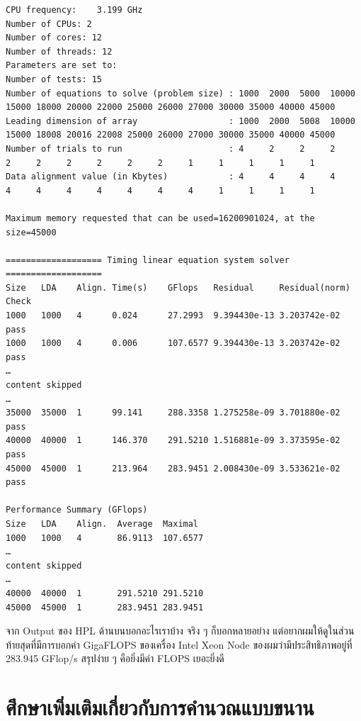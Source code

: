 \begin{lstlisting}[basicstyle=\ttfamily\footnotesize\linespread{0.5}]
CPU frequency:    3.199 GHz
Number of CPUs: 2
Number of cores: 12
Number of threads: 12
Parameters are set to:
Number of tests: 15
Number of equations to solve (problem size) : 1000  2000  5000  10000 15000 18000 20000 22000 25000 26000 27000 30000 35000 40000 45000
Leading dimension of array                  : 1000  2000  5008  10000 15000 18008 20016 22008 25000 26000 27000 30000 35000 40000 45000
Number of trials to run                     : 4     2     2     2     2     2     2     2     2     2     1     1     1     1     1
Data alignment value (in Kbytes)            : 4     4     4     4     4     4     4     4     4     4     4     1     1     1     1

Maximum memory requested that can be used=16200901024, at the size=45000

=================== Timing linear equation system solver ===================
Size   LDA    Align. Time(s)    GFlops   Residual     Residual(norm) Check
1000   1000   4      0.024      27.2993  9.394430e-13 3.203742e-02   pass
1000   1000   4      0.006      107.6577 9.394430e-13 3.203742e-02   pass
…
content skipped
…
35000  35000  1      99.141     288.3358 1.275258e-09 3.701880e-02   pass
40000  40000  1      146.370    291.5210 1.516881e-09 3.373595e-02   pass
45000  45000  1      213.964    283.9451 2.008430e-09 3.533621e-02   pass

Performance Summary (GFlops)
Size   LDA    Align.  Average  Maximal
1000   1000   4       86.9113  107.6577
…
content skipped
…
40000  40000  1       291.5210 291.5210
45000  45000  1       283.9451 283.9451
\end{lstlisting}

\vspace{5pt}

จาก Output ของ HPL ด้านบนบอกอะไรเราบ้าง จริง ๆ ก็บอกหลายอย่าง แต่อยากผมให้ดูในส่วนท้ายสุดที่มีการบอกค่า GigaFLOPS ของเครื่อง Intel Xeon Node ของผมว่ามีประสิทธิภาพอยู่ที่ 283.945 GFlop/s สรุปง่าย ๆ คือยิ่งมีค่า FLOPS เยอะยิ่งดี

\section{ศึกษาเพิ่มเติมเกี่ยวกับการคำนวณแบบขนาน}

